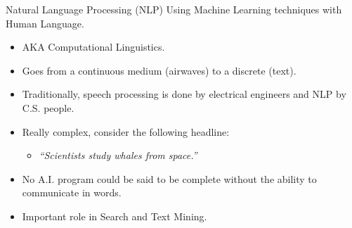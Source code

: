 \documentclass[9pt]{beamer}
\begin{document}
\begin{frame}{Natural Language Processing (NLP)}
    Using Machine Learning techniques with Human Language.
    \begin{itemize}
            \item AKA Computational Linguistics.
            \item Goes from a continuous medium (airwaves) to a discrete (text).
        \item Traditionally, speech processing is done by electrical engineers and NLP by C.S. people.
            \item Really complex, consider the following headline:
                \begin{itemize}
                    \item \textit{``Scientists study whales from space.''}
                \end{itemize}
    \item No A.I. program could be said to be complete without the ability to communicate in words.
        \item Important role in Search and Text Mining.
    \end{itemize}
     
\end{frame}
\end{document}

